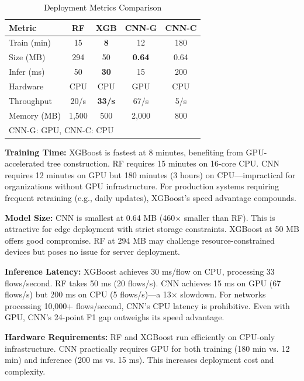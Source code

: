 \documentclass[10pt,twocolumn]{article}
\begin{document}
\begin{table}[htbp]
\caption{Deployment Metrics Comparison}
\label{tab:deployment}
\centering
\small
\begin{tabular}{lcccc}
\toprule
\textbf{Metric} & \textbf{RF} & \textbf{XGB} & \textbf{CNN-G} & \textbf{CNN-C} \\
\midrule
Train (min) & 15 & \textbf{8} & 12 & 180 \\
Size (MB) & 294 & 50 & \textbf{0.64} & 0.64 \\
Infer (ms) & 50 & \textbf{30} & 15 & 200 \\
Hardware & CPU & CPU & GPU & CPU \\
Throughput & 20/s & \textbf{33/s} & 67/s & 5/s \\
Memory (MB) & 1,500 & 500 & 2,000 & 800 \\
\bottomrule
\multicolumn{5}{l}{\footnotesize CNN-G: GPU, CNN-C: CPU}
\end{tabular}
\end{table}

\textbf{Training Time:} XGBoost is fastest at 8 minutes, benefiting from GPU-accelerated tree construction. RF requires 15 minutes on 16-core CPU. CNN requires 12 minutes on GPU but 180 minutes (3 hours) on CPU---impractical for organizations without GPU infrastructure. For production systems requiring frequent retraining (e.g., daily updates), XGBoost's speed advantage compounds.

\textbf{Model Size:} CNN is smallest at 0.64 MB (460× smaller than RF). This is attractive for edge deployment with strict storage constraints. XGBoost at 50 MB offers good compromise. RF at 294 MB may challenge resource-constrained devices but poses no issue for server deployment.

\textbf{Inference Latency:} XGBoost achieves 30 ms/flow on CPU, processing 33 flows/second. RF takes 50 ms (20 flows/s). CNN achieves 15 ms on GPU (67 flows/s) but 200 ms on CPU (5 flows/s)---a 13× slowdown. For networks processing 10,000+ flows/second, CNN's CPU latency is prohibitive. Even with GPU, CNN's 24-point F1 gap outweighs its speed advantage.

\textbf{Hardware Requirements:} RF and XGBoost run efficiently on CPU-only infrastructure. CNN practically requires GPU for both training (180 min vs. 12 min) and inference (200 ms vs. 15 ms). This increases deployment cost and complexity.
\end{document}
